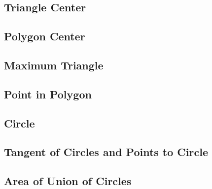 \documentclass[a4paper,10pt,twocolumn,oneside]{article}
\begin{document}
\subsection{Triangle Center}

\subsection{Polygon Center}

\subsection{Maximum Triangle}

\subsection{Point in Polygon}

% 
% 
% 
\subsection{Circle}

\subsection{Tangent of Circles and Points to Circle}

\subsection{Area of Union of Circles}

% 
% 
\end{document}

